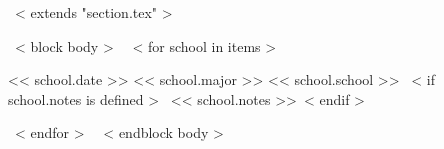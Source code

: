 ~< extends "section.tex" >~

~< block body >~
  ~< for school in items >~
    \begin{samepage}
      \cventry
        {<< school.date >>}
        {<< school.major >>}
        {<< school.school >>}
        {}
        {}
        {~< if school.notes is defined >~ \vspace{1.5pt} \normalsize << school.notes >>~< endif >~}
    \end{samepage}
    \vspace{10pt}
  ~< endfor >~
  \vspace{-10pt}
~< endblock body >~
